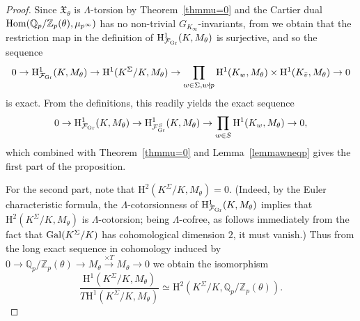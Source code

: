 \documentclass[10pt]{amsart}
\numberwithin{equation}{section}
\theoremstyle{definition}
\theoremstyle{remark}
\newcommand{\Fcal}{\mathcal{F}}
\newcommand{\bZ}{\mathbb{Z}}
\newcommand{\bQ}{\mathbb{Q}}
\newcommand{\rH}{\mathrm{H}}
\begin{document}
\begin{proof}
Since $\mathfrak{X}_{\theta}$ is $\Lambda$-torsion by Theorem~\ref{thmmu=0} and the Cartier dual ${\rm Hom}(\bQ_p/\bZ_p(\theta),\mu_{p^\infty})$ has no non-trivial $G_{K_\infty}$-invariants, from \cite[Prop.~A.2]{pollack2011anticyclotomic} we obtain that the restriction map in the definition of $\rH^{1}_{\Fcal_{\rm Gr}}(K,M_\theta)$ is surjective, and so the sequence
\begin{equation}\label{eq:sur1}
 0 \rightarrow \rH^{1}_{\Fcal_{\rm Gr}}(K,M_\theta) \rightarrow\rH^{1}(K^{\Sigma}/K, M_\theta) \rightarrow \prod_{w\in\Sigma, w\nmid p}\rH^1(K_w,M_\theta) \times \rH^{1}(K_{\bar{v}}, M_\theta)\rightarrow 0
\end{equation}
is exact. From the definitions, this readily yields the exact sequence 
\begin{equation}\label{eq:sur2}
0 \rightarrow\rH^{1}_{\Fcal_{\rm Gr}}(K,M_\theta) \rightarrow\rH^{1}_{\Fcal_{\rm Gr}^S}(K,M_\theta) \rightarrow \prod_{w\in S}\rH^1(K_w,M_\theta) \rightarrow 0,
\end{equation}
which combined with Theorem~\ref{thmmu=0} and Lemma~\ref{lemmawneqp}  gives the first part of the proposition.

For the second part, note that $\rH^{2}(K^{\Sigma}/K,M_\theta)=0$. (Indeed, by the Euler characteristic formula, the $\Lambda$-cotorsionness of $\rH^{1}_{\Fcal_{\rm Gr}}(K,M_\theta)$ implies that $\rH^{2}(K^{\Sigma}/K,M_\theta)$ is $\Lambda$-cotorsion; being $\Lambda$-cofree, as follows immediately from the fact that ${\rm Gal}(K^\Sigma/K)$ has cohomological dimension $2$, it must vanish.) Thus from the long exact sequence in cohomology induced by 
$0\rightarrow \bQ_p/\bZ_p(\theta)\rightarrow M_\theta\xrightarrow{\times T}M_\theta\rightarrow 0$ 
we obtain the isomorphism
\[
\frac{\rH^{1}(K^{\Sigma}/K,M_\theta)}{T\rH^{1}(K^{\Sigma}/K,M_\theta)} \simeq\rH^{2}(K^{\Sigma}/K,\bQ_p/\bZ_p(\theta)).
\]


\end{proof}
\end{document}
